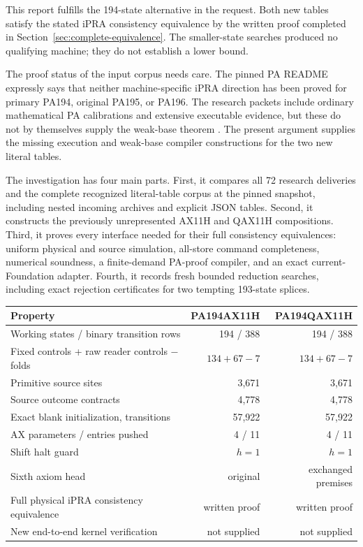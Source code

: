 \documentclass[11pt,a4paper]{article}
\begin{document}
This report fulfills the 194-state alternative in the request. Both
new tables satisfy the stated iPRA consistency equivalence by the written
proof completed in Section~\ref{sec:complete-equivalence}. The smaller-state
searches produced no qualifying machine; they do not establish a lower
bound.

The proof status of the input corpus needs care. The pinned PA README
expressly says that neither machine-specific iPRA direction has been
proved for primary PA194, original PA195, or PA196. The research packets
include ordinary mathematical PA calibrations and extensive executable
evidence, but these do not by themselves supply the weak-base theorem
\cite{pa-status}. The present argument supplies the missing execution
and weak-base compiler constructions for the two new literal tables.

The investigation has four main parts. First, it compares all 72 research
deliveries and the complete recognized literal-table corpus at the pinned
snapshot, including nested incoming archives and explicit JSON tables.
Second, it constructs the previously unrepresented AX11H and QAX11H
compositions. Third, it proves every interface needed for their full
consistency equivalences: uniform physical and source simulation,
all-store command completeness, numerical soundness, a finite-demand
PA-proof compiler, and an exact current-Foundation adapter. Fourth, it
records fresh bounded reduction searches, including exact rejection
certificates for two tempting 193-state splices.

\begin{center}
\begin{tabular}{lrr}
\toprule
Property & PA194AX11H & PA194QAX11H\\
\midrule
Working states / binary transition rows & 194 / 388 & 194 / 388\\
Fixed controls + raw reader controls $-$ folds & $134+67-7$ & $134+67-7$\\
Primitive source sites & 3,671 & 3,671\\
Source outcome contracts & 4,778 & 4,778\\
Exact blank initialization, transitions & 57,922 & 57,922\\
AX parameters / entries pushed & 4 / 11 & 4 / 11\\
Shift halt guard & $h=1$ & $h=1$\\
Sixth axiom head & original & exchanged premises\\
Full physical iPRA consistency equivalence & written proof & written proof\\
New end-to-end kernel verification & not supplied & not supplied\\
\bottomrule
\end{tabular}
\end{center}
\end{document}
